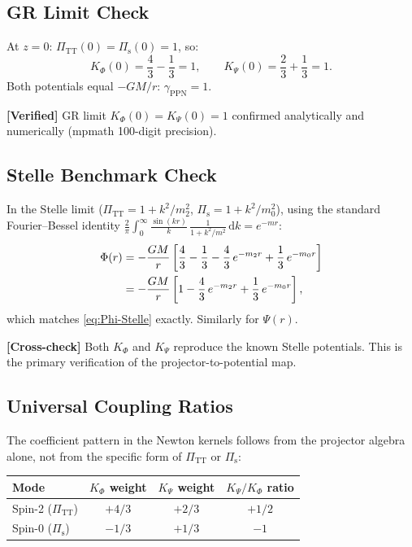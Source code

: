 \documentclass[11pt,a4paper]{article}
\theoremstyle{plain}
\theoremstyle{definition}
\theoremstyle{remark}
\newcommand{\dd}{\mathrm{d}}
\newcommand{\verified}[1]{%
  \par\smallskip\noindent
  \colorbox{green!10}{\parbox{\dimexpr\linewidth-2\fboxsep}{%
    \textcolor{verified}{\textbf{[Verified]}} #1}}%
  \par\smallskip}
\newcommand{\crosscheck}[1]{%
  \par\smallskip\noindent
  \colorbox{blue!10}{\parbox{\dimexpr\linewidth-2\fboxsep}{%
    \textcolor{sctblue}{\textbf{[Cross-check]}} #1}}%
  \par\smallskip}
\begin{document}
\subsection{GR Limit Check}

At $z = 0$: $\Pi_{\mathrm{TT}}(0) = \Pi_{\mathrm{s}}(0) = 1$, so:
\begin{equation}
  K_\Phi(0) = \frac{4}{3} - \frac{1}{3} = 1,\qquad
  K_\Psi(0) = \frac{2}{3} + \frac{1}{3} = 1.
\end{equation}
Both potentials equal $-GM/r$: $\gamma_{\mathrm{PPN}} = 1$.

\verified{GR limit $K_\Phi(0) = K_\Psi(0) = 1$ confirmed analytically
and numerically (mpmath 100-digit precision).}

\subsection{Stelle Benchmark Check}

In the Stelle limit ($\Pi_{\mathrm{TT}} = 1 + k^2/m_2^2$,
$\Pi_{\mathrm{s}} = 1 + k^2/m_0^2$), using the standard Fourier--Bessel
identity
$\frac{2}{\pi}\int_0^\infty \frac{\sin(kr)}{k}\,
\frac{1}{1+k^2/m^2}\,\dd k = e^{-mr}$:
\begin{align}
  \Phi(r) &= -\frac{GM}{r}\left[
    \frac{4}{3} - \frac{1}{3}
    - \frac{4}{3}\,e^{-m_2 r} + \frac{1}{3}\,e^{-m_0 r}
  \right] \notag\\
  &= -\frac{GM}{r}\left[
    1 - \frac{4}{3}\,e^{-m_2 r} + \frac{1}{3}\,e^{-m_0 r}
  \right],
\end{align}
which matches \eqref{eq:Phi-Stelle} exactly.  Similarly for $\Psi(r)$.

\crosscheck{Both $K_\Phi$ and $K_\Psi$ reproduce the known Stelle
potentials.  This is the primary verification of the
projector-to-potential map.}

\subsection{Universal Coupling Ratios}

The coefficient pattern in the Newton kernels follows from the
projector algebra alone, not from the specific form of
$\Pi_{\mathrm{TT}}$ or $\Pi_{\mathrm{s}}$:

\begin{center}
\begin{tabular}{lccc}
\toprule
Mode & $K_\Phi$ weight & $K_\Psi$ weight & $K_\Psi/K_\Phi$ ratio \\
\midrule
Spin-2 ($\Pi_{\mathrm{TT}}$) & $+4/3$ & $+2/3$ & $+1/2$ \\
Spin-0 ($\Pi_{\mathrm{s}}$) & $-1/3$ & $+1/3$ & $-1$ \\
\bottomrule
\end{tabular}
\end{center}
\end{document}
